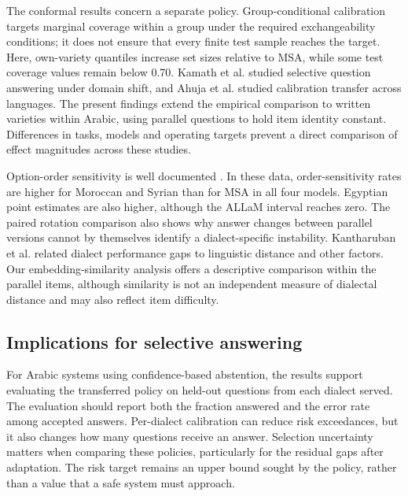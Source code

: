 \documentclass[applsci,article,submit,pdftex,oneauthor]{Definitions/mdpi}
\begin{document}
The conformal results concern a separate policy. Group-conditional calibration \cite{vovk2012conditional, romano2020malice} targets marginal coverage within a group under the required exchangeability conditions; it does not ensure that every finite test sample reaches the target. Here, own-variety quantiles increase set sizes relative to MSA, while some test coverage values remain below 0.70. Kamath et al. \cite{kamath2020selective} studied selective question answering under domain shift, and Ahuja et al. \cite{ahuja2022calibration} studied calibration transfer across languages. The present findings extend the empirical comparison to written varieties within Arabic, using parallel questions to hold item identity constant. Differences in tasks, models and operating targets prevent a direct comparison of effect magnitudes across these studies.

Option-order sensitivity is well documented \cite{zheng2024robust, pezeshkpour2024sensitivity}. In these data, order-sensitivity rates are higher for Moroccan and Syrian than for MSA in all four models. Egyptian point estimates are also higher, although the ALLaM interval reaches zero. The paired rotation comparison also shows why answer changes between parallel versions cannot by themselves identify a dialect-specific instability. Kantharuban et al. \cite{kantharuban2023quantifying} related dialect performance gaps to linguistic distance and other factors. Our embedding-similarity analysis offers a descriptive comparison within the parallel items, although similarity is not an independent measure of dialectal distance and may also reflect item difficulty.

\hypertarget{what-the-results-mean-for-systems-that-abstain-on-a-confidence-score}{%
\subsection{Implications for selective answering}\label{what-the-results-mean-for-systems-that-abstain-on-a-confidence-score}}

For Arabic systems using confidence-based abstention, the results support evaluating the transferred policy on held-out questions from each dialect served. The evaluation should report both the fraction answered and the error rate among accepted answers. Per-dialect calibration can reduce risk exceedances, but it also changes how many questions receive an answer. Selection uncertainty matters when comparing these policies, particularly for the residual gaps after adaptation. The risk target remains an upper bound sought by the policy, rather than a value that a safe system must approach.
\end{document}
